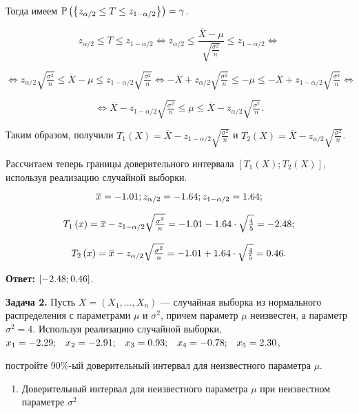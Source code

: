 Тогда имеем ${\rm {\mathbb P}}\left(\left\{z_{\alpha /2} \le T\le z_{1-\alpha /2} \right\}\right)=\gamma $.

\[z_{\alpha /2} \le T\le z_{1-\alpha /2} \Leftrightarrow z_{\alpha /2} \le \frac{\overline{X}-\mu }{\sqrt{{\tfrac{\sigma ^{2} }{n}} } } \le z_{1-\alpha /2} \Leftrightarrow \] 

\[\Leftrightarrow z_{\alpha /2} \sqrt{{\tfrac{\sigma ^{2} }{n}} } \le \overline{X}-\mu \le z_{1-\alpha /2} \sqrt{{\tfrac{\sigma ^{2} }{n}} } \Leftrightarrow -\overline{X}+z_{\alpha /2} \sqrt{{\tfrac{\sigma ^{2} }{n}} } \le -\mu \le -\overline{X}+z_{1-\alpha /2} \sqrt{{\tfrac{\sigma ^{2} }{n}} } \Leftrightarrow \] 

\[\Leftrightarrow \overline{X}-z_{1-\alpha /2} \sqrt{{\tfrac{\sigma ^{2} }{n}} } \le \mu \le \overline{X}-z_{\alpha /2} \sqrt{{\tfrac{\sigma ^{2} }{n}} } .\] 

Таким образом, получили $T_{1} \left(X\right)=\overline{X}-z_{1-\alpha /2} \sqrt{{\tfrac{\sigma ^{2} }{n}} } $ и $T_{2} \left(X\right)=\overline{X}-z_{\alpha /2} \sqrt{{\tfrac{\sigma ^{2} }{n}} } $.

Рассчитаем теперь границы доверительного интервала $\left[T_{1} \left(X\right);T_{2} \left(X\right)\right]$, используя реализацию случайной выборки.

\[\overline{x}=-{\rm 1.01}; z_{\alpha /2} =-{\rm 1.64}; z_{1-\alpha /2} ={\rm 1.64};\] 

\[T_{1} \left(x\right)=\overline{x}-z_{1-\alpha /2} \sqrt{{\tfrac{\sigma ^{2} }{n}} } =-{\rm 1.01}-{\rm 1.64}\cdot \sqrt{{\tfrac{4}{5}} } =-{\rm 2.48};\] 

\[T_{2} \left(x\right)=\overline{x}-z_{\alpha /2} \sqrt{{\tfrac{\sigma ^{2} }{n}} } =-{\rm 1.01+1.64}\cdot \sqrt{{\tfrac{4}{5}} } ={\rm 0.46}.\] 

\textbf{Ответ:} $\left[-{\rm 2.48};{\rm 0.46}\right]$.



\textbf{Задача 2.}  Пусть $X=\left(X_{1} ,...,X_{n} \right)$ --- случайная выборка из нормального распределения с параметрами $\mu $ и $\sigma ^{2} $, причем параметр $\mu $ неизвестен, а параметр $\sigma ^{2} =4$. Используя реализацию случайной выборки, $x_{1} =-{\rm 2.29;}\quad x_{2} =-{\rm 2.91;}\quad x_{3} =0.{\rm 93;}\quad x_{4} =-0.{\rm 78;}\quad x_{5} ={\rm 2.3}0$, 

постройте 90\%-ый доверительный интервал для неизвестного параметра $\mu $.



\begin{enumerate}
\item  Доверительный интервал для неизвестного параметра $\mu $ при неизвестном параметре $\sigma ^{2} $ 
\end{enumerate}



